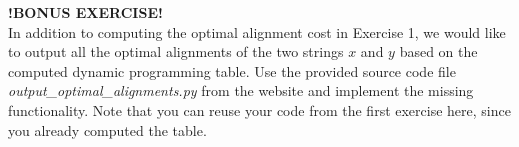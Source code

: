   \textbf{!BONUS EXERCISE!}\\
In addition to computing the optimal alignment cost in Exercise 1, we would like to output all
the optimal alignments of the two strings $x$ and $y$ based on the computed dynamic programming
table. Use the provided source code file \emph{output\_optimal\_alignments.py} from the website and
implement the missing functionality. Note that you can reuse your code from the first exercise
here, since you already computed the table.




